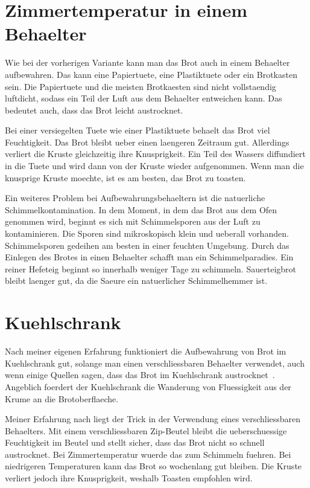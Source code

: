 \section{Zimmertemperatur in einem Behaelter}

Wie bei der vorherigen Variante kann man das Brot auch in einem Behaelter
aufbewahren. Das kann eine Papiertuete, eine Plastiktuete oder ein
Brotkasten sein. Die Papiertuete und die meisten Brotkaesten sind nicht
vollstaendig luftdicht, sodass ein Teil der Luft aus dem Behaelter entweichen
kann. Das bedeutet auch, dass das Brot leicht austrocknet.

Bei einer versiegelten Tuete wie einer Plastiktuete behaelt das Brot viel
Feuchtigkeit. Das Brot bleibt ueber einen laengeren Zeitraum gut. Allerdings
verliert die Kruste gleichzeitig ihre Knusprigkeit. Ein Teil des Wassers
diffundiert in die Tuete und wird dann von der Kruste wieder aufgenommen. Wenn
man die knusprige Kruste moechte, ist es am besten, das Brot zu toasten.

Ein weiteres Problem bei Aufbewahrungsbehaeltern ist die natuerliche
Schimmelkontamination. In dem Moment, in dem das Brot aus dem Ofen genommen
wird, beginnt es sich mit Schimmelsporen aus der Luft zu kontaminieren. Die
Sporen sind mikroskopisch klein und ueberall vorhanden. Schimmelsporen
gedeihen am besten in einer feuchten Umgebung. Durch das Einlegen des Brotes
in einen Behaelter schafft man ein Schimmelparadies. Ein reiner Hefeteig
beginnt so innerhalb weniger Tage zu schimmeln. Sauerteigbrot bleibt laenger
gut, da die Saeure ein natuerlicher Schimmelhemmer ist.

\section{Kuehlschrank}

Nach meiner eigenen Erfahrung funktioniert die Aufbewahrung von Brot im
Kuehlschrank gut, solange man einen verschliessbaren Behaelter verwendet, auch
wenn einige Quellen sagen, dass das Brot im Kuehlschrank
austrocknet~\cite{storing+bread}. Angeblich foerdert der Kuehlschrank die
Wanderung von Fluessigkeit aus der Krume an die Brotoberflaeche.

Meiner Erfahrung nach liegt der Trick in der Verwendung eines
verschliessbaren Behaelters. Mit einem verschliessbaren Zip-Beutel bleibt die
ueberschuessige Feuchtigkeit im Beutel und stellt sicher, dass das Brot nicht
so schnell austrocknet. Bei Zimmertemperatur wuerde das zum Schimmeln fuehren.
Bei niedrigeren Temperaturen kann das Brot so wochenlang gut bleiben. Die
Kruste verliert jedoch ihre Knusprigkeit, weshalb Toasten empfohlen wird.

